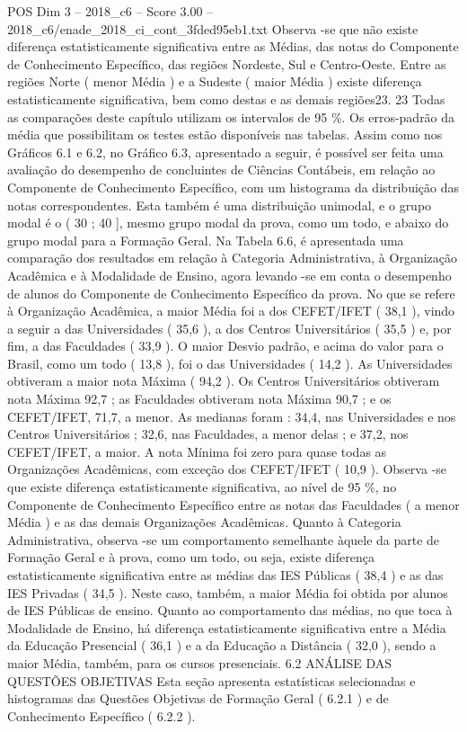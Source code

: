 \begin{textsample}{POS Dim 3 – 2018\_c6 – Score 3.00 – 2018\_c6/enade\_2018\_ci\_cont\_3fded95eb1.txt}
Observa -se que não existe diferença estatisticamente significativa entre as Médias, das notas do Componente de Conhecimento Específico, das regiões Nordeste, Sul e Centro-Oeste.
Entre as regiões Norte ( menor Média ) e a Sudeste ( maior Média ) existe diferença estatisticamente significativa, bem como destas e as demais regiões23. 23 Todas as comparações deste capítulo utilizam os intervalos de 95 \%.
Os erros-padrão da média que possibilitam os testes estão disponíveis nas tabelas.
Assim como nos Gráficos 6.1 e 6.2, no Gráfico 6.3, apresentado a seguir, é possível ser feita uma avaliação do desempenho de concluintes de Ciências Contábeis, em relação ao Componente de Conhecimento Específico, com um histograma da distribuição das notas correspondentes.
Esta também é uma distribuição unimodal, e o grupo modal é o ( 30 ; 40 ], mesmo grupo modal da prova, como um todo, e abaixo do grupo modal para a Formação Geral.
Na Tabela 6.6, é apresentada uma comparação dos resultados em relação à Categoria Administrativa, à Organização Acadêmica e à Modalidade de Ensino, agora levando -se em conta o desempenho de alunos do Componente de Conhecimento Específico da prova.
No que se refere à Organização Acadêmica, a maior Média foi a dos CEFET/IFET ( 38,1 ), vindo a seguir a das Universidades ( 35,6 ), a dos Centros Universitários ( 35,5 ) e, por fim, a das Faculdades ( 33,9 ).
O maior Desvio padrão, e acima do valor para o Brasil, como um todo ( 13,8 ), foi o das Universidades ( 14,2 ).
As Universidades obtiveram a maior nota Máxima ( 94,2 ).
Os Centros Universitários obtiveram nota Máxima 92,7 ; as Faculdades obtiveram nota Máxima 90,7 ; e os CEFET/IFET, 71,7, a menor.
As medianas foram : 34,4, nas Universidades e nos Centros Universitários ; 32,6, nas Faculdades, a menor delas ; e 37,2, nos CEFET/IFET, a maior.
A nota Mínima foi zero para quase todas as Organizações Acadêmicas, com exceção dos CEFET/IFET ( 10,9 ).
Observa -se que existe diferença estatisticamente significativa, ao nível de 95 \%, no Componente de Conhecimento Específico entre as notas das Faculdades ( a menor Média ) e as das demais Organizações Acadêmicas.
Quanto à Categoria Administrativa, observa -se um comportamento semelhante àquele da parte de Formação Geral e à prova, como um todo, ou seja, existe diferença estatisticamente significativa entre as médias das IES Públicas ( 38,4 ) e as das IES Privadas ( 34,5 ).
Neste caso, também, a maior Média foi obtida por alunos de IES Públicas de ensino.
Quanto ao comportamento das médias, no que toca à Modalidade de Ensino, há diferença estatisticamente significativa entre a Média da Educação Presencial ( 36,1 ) e a da Educação a Distância ( 32,0 ), sendo a maior Média, também, para os cursos presenciais. 6.2 ANÁLISE DAS QUESTÕES OBJETIVAS Esta seção apresenta estatísticas selecionadas e histogramas das Questões Objetivas de Formação Geral ( 6.2.1 ) e de Conhecimento Específico ( 6.2.2 ).

\end{textsample}
